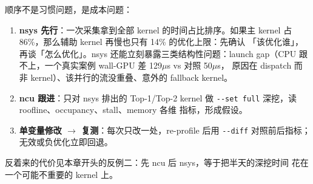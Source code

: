 顺序不是习惯问题，是成本问题：

\begin{enumerate}
\item \textbf{nsys 先行}：一次采集拿到全部 kernel 的时间占比排序。如果主
  kernel 占 86\%，那么辅助 kernel 再慢也只有 14\% 的优化上限：先确认
  「该优化谁」，再谈「怎么优化」。nsys 还能立刻暴露三类结构性问题：launch
  gap（CPU 跟不上，一个真实案例 wall-GPU 差 129$\mu$s vs 对照 50$\mu$s，
  原因在 dispatch 而非 kernel）、该并行的流没重叠、意外的 fallback kernel。
\item \textbf{ncu 跟进}：只对 nsys 排出的 Top-1/Top-2 kernel 做
  \texttt{-{}-set full} 深挖，读 roofline、occupancy、stall、memory 各维
  指标，形成假设。
\item \textbf{单变量修改 $\to$ 复测}：每次只改一处，re-profile 后用
  \texttt{-{}-diff} 对照前后指标；无效或负优化立即回退。
\end{enumerate}

反着来的代价见本章开头的反例二：先 ncu 后 nsys，等于把半天的深挖时间
花在一个可能不重要的 kernel 上。


